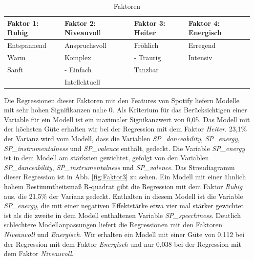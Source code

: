 \begin{table}[htbp]
    \centering
    \caption{Faktoren}
    \vspace{2mm}
    \label{tab:faktoren}
        \begin{tabularx}{8cm}{|X|X|X|X|}
            \hline Faktor 1: \textbf{Ruhig} & Faktor 2: \textbf{Niveauvoll} & Faktor 3: \textbf{Heiter} & Faktor 4: \textbf{Energisch} \\
            \hline Entspan\-nend & Anspruchs\-voll       & Fröhlich             & Erregend \\
            \hline Warm              & Komplex                  & - Traurig            & Intensiv \\
            \hline Sanft               & - Einfach                 & Tanzbar             & \\
            \hline                        & Intellek\-tuell          &                          & \\
            \hline
        \end{tabularx}
\end{table}


Die Regressionen dieser Faktoren mit den Features von Spotify liefern Modelle mit sehr hohen Signifikanzen nahe 0.
Als Kriterium für das Berücksichtigen einer Variable für ein Modell ist ein maximaler Signikanzwert von  0,05.  
Das Modell mit der höchsten Güte erhalten wir bei der Regression mit dem Faktor \textit{Heiter}.
23,1\% der Varianz wird vom Modell, dass die Variablen \textit{SP\_danceability}, \textit{SP\_energy}, \textit{SP\_instrumentalness} und \textit{SP\_valence} enthält, gedeckt.
Die Variable \textit{SP\_energy} ist in dem Modell am stärksten gewichtet, gefolgt von den Variablen \textit{SP\_danceability},  \textit{SP\_instrumentalness} und \textit{SP\_valence}.
Das Streudiagramm dieser Regression ist in Abb. \ref{fig:Faktor3} zu sehen.    
Ein Modell mit einer ähnlich hohem Bestimmtheitsmaß R-quadrat gibt die Regression mit dem Faktor \textit{Ruhig} aus, die 21,5\% der Varianz gedeckt.
Enthalten in diesem Modell ist die Variable \textit{SP\_energy}, die mit einer negativen Effektstärke etwa vier mal stärker gewichtet ist als die zweite in dem Modell enthaltenen Variable \textit{SP\_speechiness}.
Deutlich schlechtere Modellanpassungen liefert die Regressionen mit den Faktoren \textit{Niveauvoll} und \textit{Energisch}.
Wir erhalten ein Modell mit einer Güte von 0,112 bei der Regression mit dem Faktor \textit{Energisch} und nur 0,038 bei der Regression mit dem Faktor \textit{Niveauvoll}.


